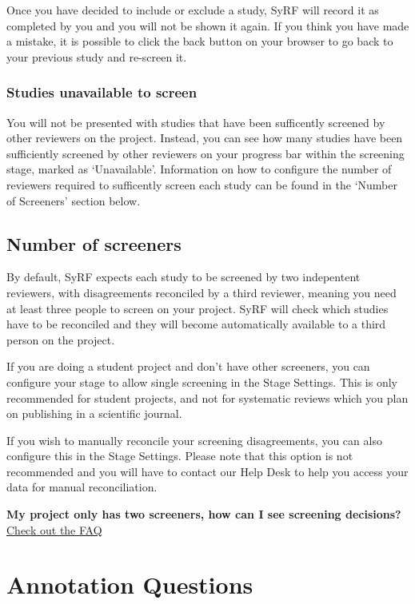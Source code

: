 \documentclass[
]{book}
\begin{document}
Once you have decided to include or exclude a study, SyRF will record it as completed by you and you will not be shown it again. If you think you have made a mistake, it is possible to click the back button on your browser to go back to your previous study and re-screen it.

\hypertarget{studies-unavailable-to-screen}{%
\subsection{Studies unavailable to screen}\label{studies-unavailable-to-screen}}

You will not be presented with studies that have been sufficently screened by other reviewers on the project. Instead, you can see how many studies have been sufficiently screened by other reviewers on your progress bar within the screening stage, marked as `Unavailable'. Information on how to configure the number of reviewers required to sufficently screen each study can be found in the `Number of Screeners' section below.

\hypertarget{number-of-screeners}{%
\section{Number of screeners}\label{number-of-screeners}}

By default, SyRF expects each study to be screened by two indepentent reviewers, with disagreements reconciled by a third reviewer, meaning you need at least three people to screen on your project. SyRF will check which studies have to be reconciled and they will become automatically available to a third person on the project.

If you are doing a student project and don't have other screeners, you can configure your stage to allow single screening in the Stage Settings. This is only recommended for student projects, and not for systematic reviews which you plan on publishing in a scientific journal.

If you wish to manually reconcile your screening disagreements, you can also configure this in the Stage Settings. Please note that this option is not recommended and you will have to contact our Help Desk to help you access your data for manual reconciliation.

\textbf{My project only has two screeners, how can I see screening decisions?}
\href{https://syrf.org.uk/faq}{Check out the FAQ}

\hypertarget{projectannotation}{%
\chapter{Annotation Questions}\label{projectannotation}}
\end{document}
